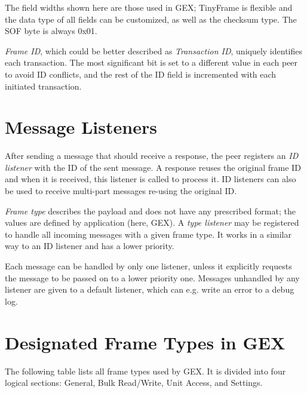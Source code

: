 The field widths shown here are those used in GEX; TinyFrame is flexible and the data type of all fields can be customized, as well as the checksum type. The SOF byte is always 0x01.

\textit{Frame ID}, which could be better described as \textit{Transaction ID}, uniquely identifies each transaction. The most significant bit is set to a different value in each peer to avoid ID conflicts, and the rest of the ID field is incremented with each initiated transaction.

\section{Message Listeners}

After sending a message that should receive a response, the peer registers an \textit{ID listener} with the ID of the sent message. A response reuses the original frame ID and when it is received, this listener is called to process it. ID listeners can also be used to receive multi-part messages re-using the original ID.

\textit{Frame type} describes the payload and does not have any prescribed format; the values are defined by application (here, GEX). A \textit{type listener} may be registered to handle all incoming messages with a given frame type. It works in a similar way to an ID listener and has a lower priority. 

Each message can be handled by only one listener, unless it explicitly requests the message to be passed on to a lower priority one. Messages unhandled by any listener are given to a default listener, which can e.g. write an error to a debug log.

\section{Designated Frame Types in GEX}

The following table lists all frame types used by GEX. It is divided into four logical sections: General, Bulk Read/Write, Unit Access, and Settings.

